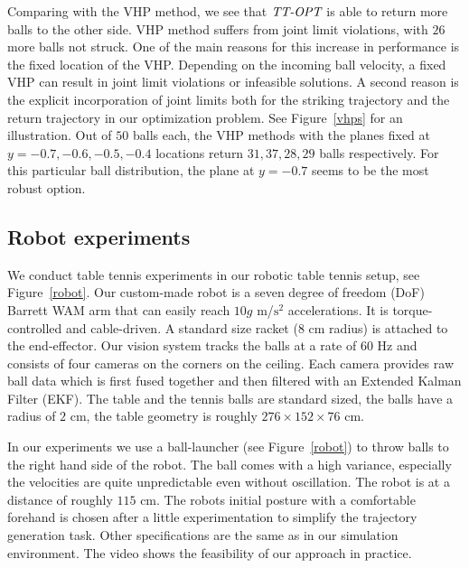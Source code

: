 Comparing with the VHP method, we see that $\emph{TT-OPT}$ is able to return more balls to the other side. VHP method suffers from joint limit violations, with $26$ more balls not struck. One of the main reasons for this increase in performance is the fixed location of the VHP. Depending on the incoming ball velocity, a fixed VHP can result in joint limit violations or infeasible solutions. A second reason is the explicit incorporation of joint limits both for the striking trajectory and the return trajectory in our optimization problem. See Figure~\ref{vhps} for an illustration. Out of $50$ balls each, the VHP methods with the planes fixed at $y = -0.7,-0.6,-0.5,-0.4$ locations return $31, 37, 28, 29$ balls respectively. For this particular ball distribution, the plane at $y = -0.7$ seems to be the most robust option.


\subsection{Robot experiments}

We conduct table tennis experiments in our robotic table tennis setup, see Figure~\ref{robot}. Our custom-made robot is a seven degree of freedom (DoF) Barrett WAM arm that can easily reach $10g$ m/$\textrm{s}^2$ accelerations. It is torque-controlled and cable-driven. A standard size racket ($8$ cm radius) is attached to the end-effector. Our vision system tracks the balls at a rate of $60$ Hz and consists of four cameras on the corners on the ceiling. Each camera provides raw ball data which is first fused together and then filtered with an Extended Kalman Filter (EKF). The table and the tennis balls are standard sized, the balls have a radius of $2$ cm, the table geometry is roughly $276 \times 152 \times 76$ cm.

In our experiments we use a ball-launcher (see Figure~\ref{robot}) to throw balls to the right hand side of the robot. The ball comes with a high variance, especially the velocities are quite unpredictable even without oscillation. The robot is at a distance of roughly $115$ cm. The robots initial posture with a comfortable forehand is chosen after a little experimentation to simplify the trajectory generation task. Other specifications are the same as in our simulation environment. The video shows the feasibility of our approach in practice.

